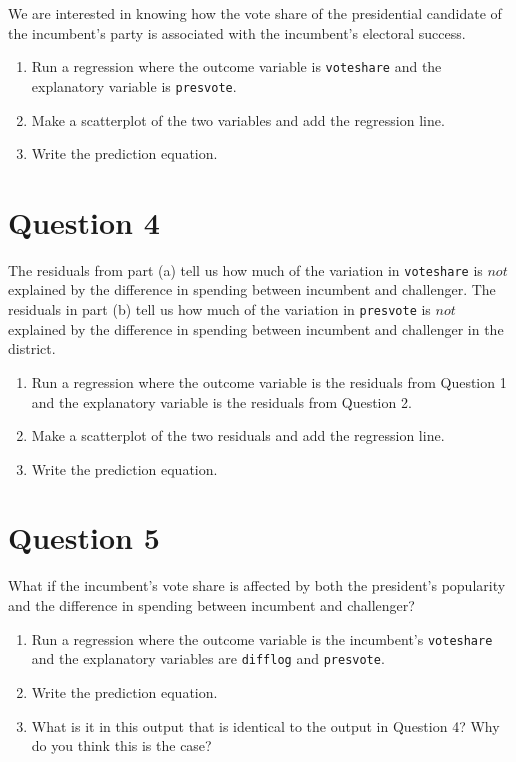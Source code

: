 \documentclass[12pt,letterpaper]{article}
\begin{document}
\noindent We are interested in knowing how the vote share of the presidential candidate of the incumbent's party is associated with the incumbent's electoral success.
	\vspace{.25cm}
	\begin{enumerate}
		\item Run a regression where the outcome variable is \texttt{voteshare} and the explanatory variable is \texttt{presvote}.
			\vspace{5cm}
		\item Make a scatterplot of the two variables and add the regression line. 
			\vspace{5cm}
		\item Write the prediction equation.
	\end{enumerate}
	

\newpage	
\section*{Question 4}
\noindent The residuals from part (a) tell us how much of the variation in \texttt{voteshare} is $not$ explained by the difference in spending between incumbent and challenger. The residuals in part (b) tell us how much of the variation in \texttt{presvote} is $not$ explained by the difference in spending between incumbent and challenger in the district.
	\begin{enumerate}
		\item Run a regression where the outcome variable is the residuals from Question 1 and the explanatory variable is the residuals from Question 2.	\vspace{6cm}
		\item Make a scatterplot of the two residuals and add the regression line. 	\vspace{6cm}
		\item Write the prediction equation.
	\end{enumerate}
	
	\newpage	

\section*{Question 5}
\noindent What if the incumbent's vote share is affected by both the president's popularity and the difference in spending between incumbent and challenger? 
	\begin{enumerate}
		\item Run a regression where the outcome variable is the incumbent's \texttt{voteshare} and the explanatory variables are \texttt{difflog} and \texttt{presvote}.	\vspace{5cm}
		\item Write the prediction equation.	\vspace{5cm}
		\item What is it in this output that is identical to the output in Question 4? Why do you think this is the case?
	\end{enumerate}
\end{document}
